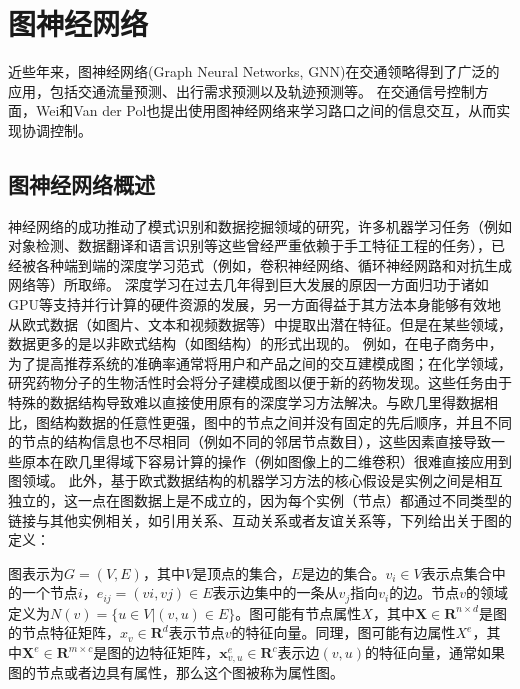 \section{图神经网络}
近些年来，图神经网络(Graph Neural Networks, GNN)在交通领略得到了广泛的应用，包括交通流量预测\cite{zhang2018kernel,guo2019attention}、出行需求预测\cite{shi2020predicting,hu2020stochastic}以及轨迹预测\cite{li2020social,sun2019socially,monti2021dag}等。
在交通信号控制方面，Wei\cite{wei2019colight}和Van der Pol\cite{van2016coordinated}也提出使用图神经网络来学习路口之间的信息交互，从而实现协调控制。
\subsection{图神经网络概述}
神经网络的成功推动了模式识别和数据挖掘领域的研究，许多机器学习任务（例如对象检测、数据翻译和语言识别等这些曾经严重依赖于手工特征工程的任务），已经被各种端到端的深度学习范式（例如，卷积神经网络、循环神经网路和对抗生成网络等）所取缔。
深度学习在过去几年得到巨大发展的原因一方面归功于诸如GPU等支持并行计算的硬件资源的发展，另一方面得益于其方法本身能够有效地从欧式数据（如图片、文本和视频数据等）中提取出潜在特征。但是在某些领域，数据更多的是以非欧式结构（如图结构）的形式出现的。
例如，在电子商务中，为了提高推荐系统的准确率通常将用户和产品之间的交互建模成图；在化学领域，研究药物分子的生物活性时会将分子建模成图以便于新的药物发现。这些任务由于特殊的数据结构导致难以直接使用原有的深度学习方法解决。与欧几里得数据相比，图结构数据的任意性更强，图中的节点之间并没有固定的先后顺序，并且不同的节点的结构信息也不尽相同（例如不同的邻居节点数目），这些因素直接导致一些原本在欧几里得域下容易计算的操作（例如图像上的二维卷积）很难直接应用到图领域。
此外，基于欧式数据结构的机器学习方法的核心假设是实例之间是相互独立的，这一点在图数据上是不成立的，因为每个实例（节点）都通过不同类型的链接与其他实例相关，如引用关系、互动关系或者友谊关系等，下列给出关于图的定义：
\begin{definition}[图]
\label{def:graph}
\end{definition}
图表示为$G=(V,E)$，其中$V$是顶点的集合，$E$是边的集合。$v_i \in V$表示点集合中的一个节点$i$，$e_{ij}=(vi, vj) \in E$表示边集中的一条从$v_j$指向$v_i$的边。节点$v$的领域定义为$N(v)=\{u \in V| (v,u) \in E\}$。图可能有节点属性$X$，其中$\mathbf{X} \in \mathbf{R}^{n \times d}$是图的节点特征矩阵，$x_v \in \mathbf{R}^d$表示节点$v$的特征向量。同理，图可能有边属性$X^e$，其中$\mathbf{X}^{e} \in \mathbf{R}^{m \times c}$是图的边特征矩阵，$\mathbf{x}_{v, u}^{e} \in \mathbf{R}^{c}$表示边$(v,u)$的特征向量，通常如果图的节点或者边具有属性，那么这个图被称为属性图。

